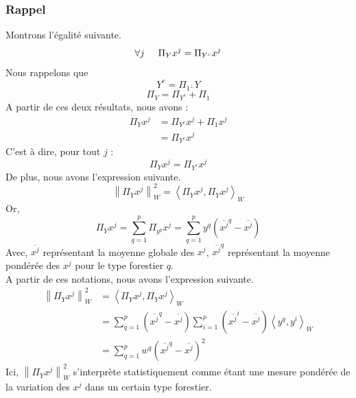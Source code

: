 \documentclass{article}
\begin{document}
\subsubsection{Rappel}
Montrons l'égalité suivante. \\
\[
\forall j \hspace{0.5cm} \Pi_Y x^j = \Pi_{Y^c} x^j
\]
Nous rappelons que 
\[
Y^c = \Pi_{1^\perp} Y 
\]
\[
\Pi_Y = \Pi_{Y^c} + \Pi_1
\]
A partir de ces deux résultats, nous avons : \\
\begin{align*}
    \Pi_Y x^j & = \Pi_{Y^c} x^j + \Pi_1 x^j \\
    &= \Pi_{Y^c} x^j
\end{align*}
C'est à dire, pour tout $j$ : 
\[
\Pi_Y x^j = \Pi_{Y^c} x^j
\]
De plus, nous avons l'expression suivante.
\[
\left\lVert \Pi_Y x^j \right\rVert^2 _W = \left\langle \Pi_Y x^j,\Pi_Y x^j\right\rangle_W
\]
Or,
\[
\Pi_Y x^j=\sum_{q = 1}^{p}\Pi_{y^q} x^j=\sum_{q = 1}^{p}y^q( \overline{x^j}^q - {\overline{x^j}} )  
\]
Avec, $\overline{x^j}$ représentant la moyenne globale des $x^j$, $\overline{x^j}^q$ représentant la moyenne pondérée des $x^j$ pour le type forestier $q$.\\
A partir de ces notations, nous avons l'expression suivante.
\begin{align*}
    \left\lVert \Pi_Y x^j \right\rVert^2 _W &= \left\langle \Pi_Y x^j,\Pi_Y x^j\right\rangle_W \\
     &=  \sum_{q = 1}^{p}( \overline{x^j}^q - {\overline{x^j}} ) \sum_{ i= 1}^{p}( \overline{x^j}^i - {\overline{x^j}} )\left\langle y^q,y^i\right\rangle_W \\
     &= \sum_{q = 1}^{p}w^q( \overline{x^j}^q - {\overline{x^j}} )^2
\end{align*}
Ici, $\left\lVert \Pi_Y x^j \right\rVert^2 _W$ s'interprète statistiquement comme
étant une mesure pondérée de la variation des $x^j$ dans un certain type forestier.
\\
\\
\end{document}
